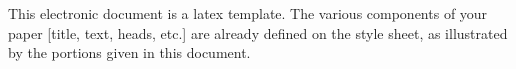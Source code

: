 
This electronic document is a latex template. The various components of your paper [title, text, heads, etc.] are already defined on the style sheet, as illustrated by the portions given in this document.

